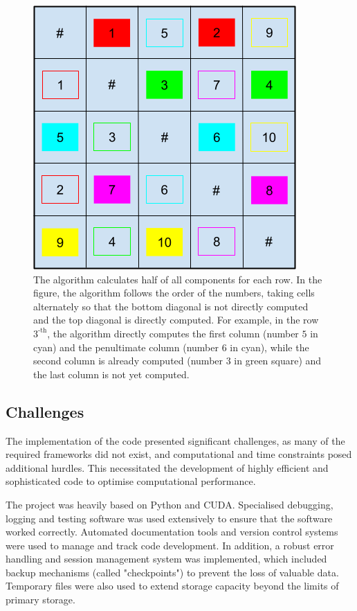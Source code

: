 \begin{toReview}
	\begin{figure}[H]
		\centering
		\includegraphics[width=0.7\linewidth]{Figures/analysis_sort.png}
		\caption[Visit all pairs combinations of a list]{The algorithm calculates half of all components for each row. In the figure, the algorithm follows the order of the numbers, taking cells alternately so that the bottom diagonal is not directly computed and the top diagonal is directly computed. For example, in the row $3^\text{-th}$, the algorithm directly computes the first column (number $5$ in cyan) and the penultimate column (number $6$ in cyan), while the second column is already computed (number $3$ in green square) and the last column is not yet computed.}
		\label{fig:distance_computation}
	\end{figure}

	\subsection{Challenges} The implementation of the code presented significant challenges, as many of the required frameworks did not exist, and computational and time constraints posed additional hurdles. This necessitated the development of highly efficient and sophisticated code to optimise computational performance.

	\noindent The project was heavily based on \gls{Python} and \gls{CUDA}. Specialised debugging, logging and testing software was used extensively to ensure that the software worked correctly. Automated documentation tools and version control systems were used to manage and track code development. In addition, a robust error handling and session management system was implemented, which included backup mechanisms (called "checkpoints") to prevent the loss of valuable data. Temporary files were also used to extend storage capacity beyond the limits of primary storage.


\end{toReview}
